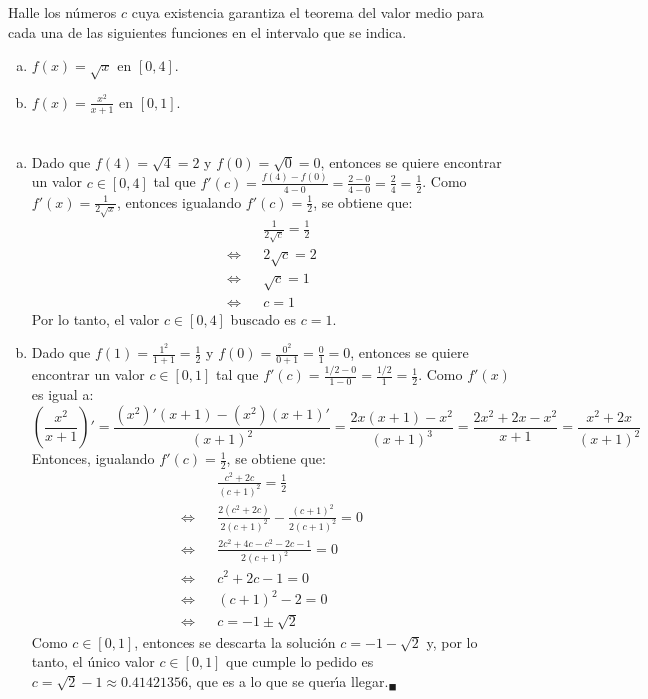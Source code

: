 \begin{enunciado}
 Halle los n\'umeros $c$ cuya existencia garantiza el teorema del valor medio para cada una de las siguientes funciones en el intervalo que se indica.
 \begin{enumerate}[(a)]
  \item $f(x) = \sqrt{x}$ en $[0,4]$.
  \item $f(x) = \displaystyle{ \frac{x^2}{x+1} }$ en $[0,1]$.
 \end{enumerate}
\end{enunciado}

\begin{solucion}
 $\phantom{0}$
 \begin{enumerate}[(a)]
  \item Dado que $f(4) = \sqrt{4} = 2$ y $f(0) = \sqrt{0} = 0$, entonces se quiere encontrar un valor $c\in[0,4]$ tal que $f'(c) = \frac{f(4)-f(0)}{4-0} = \frac{2-0}{4-0} = \frac{2}{4}=\frac{1}{2}$. Como $f'(x) = \frac{1}{2\sqrt{x}}$, entonces igualando $f'(c) =\frac{1}{2}$, se obtiene que:
  \begin{eqnarray*}
   & & \frac{1}{2\sqrt{c}} = \frac{1}{2} \\
   \Leftrightarrow & & 2\sqrt{c} = 2 \\
   \Leftrightarrow & & \sqrt{c} = 1 \\
   \Leftrightarrow & & c = 1
  \end{eqnarray*}
  Por lo tanto, el valor $c\in[0,4]$ buscado es $c=1$.
  
  \item Dado que $f(1) = \frac{1^2}{1+1} = \frac{1}{2}$ y $f(0) = \frac{0^2}{0+1} = \frac{0}{1}=0$, entonces se quiere encontrar un valor $c\in[0,1]$ tal que $f'(c) = \frac{1/2 - 0}{1-0} = \frac{1/2}{1} = \frac{1}{2}$. Como $f'(x)$ es igual a:
  \begin{equation*}
   \left( \frac{x^2}{x+1} \right)' = \frac{(x^2)'(x+1) - (x^2)(x+1)'}{(x+1)^2} = \frac{2x(x+1) - x^2}{(x+1)^3} = \frac{2x^2 + 2x - x^2}{x+1} = \frac{x^2 + 2x}{(x+1)^2}
  \end{equation*}
  Entonces, igualando $f'(c) =\frac{1}{2}$, se obtiene que:
  \begin{eqnarray*}
   & & \frac{c^2+2c}{(c+1)^2} = \frac{1}{2} \\
   \Leftrightarrow & & \frac{2(c^2+2c)}{2(c+1)^2} - \frac{(c+1)^2}{2(c+1)^2} = 0\\
   \Leftrightarrow & & \frac{2c^2 + 4c - c^2 - 2c - 1}{2(c+1)^2} = 0 \\
   \Leftrightarrow & & c^2 + 2c - 1 = 0 \\ 
   \Leftrightarrow & & (c+1)^2 -2 = 0 \\
   \Leftrightarrow & & c = -1 \pm\sqrt{2}
  \end{eqnarray*}
  Como $c\in[0,1]$, entonces se descarta la soluci\'on $c=-1-\sqrt{2}$ y, por lo tanto, el \'unico valor $c\in [0,1]$ que cumple lo pedido es $c= \sqrt{2}-1 \approx 0.41421356$, que es a lo que se quer\'{\i}a llegar.${}_{\blacksquare}$
 \end{enumerate}
\end{solucion}

